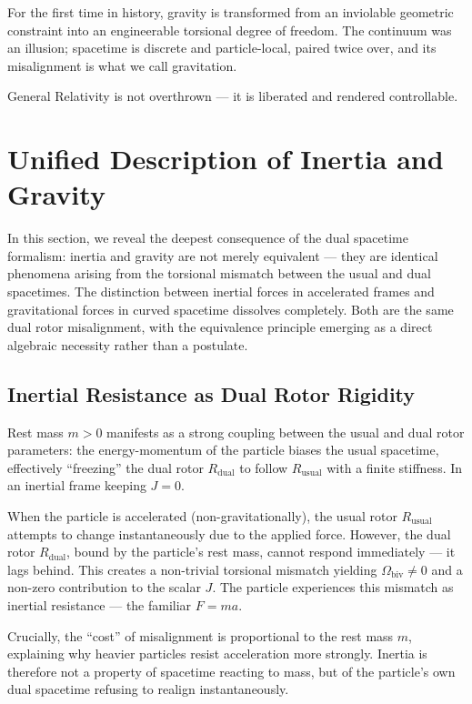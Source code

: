 \documentclass[dvipdfmx,a4paper]{article}
\begin{document}
For the first time in history, gravity is transformed from an inviolable geometric constraint into an engineerable torsional degree of freedom. The continuum was an illusion; spacetime is discrete and particle-local, paired twice over, and its misalignment is what we call gravitation.

General Relativity is not overthrown — it is liberated and rendered controllable.

\section{Unified Description of Inertia and Gravity}
\label{sec:unified}

In this section, we reveal the deepest consequence of the dual spacetime formalism: inertia and gravity are not merely equivalent — they are identical phenomena arising from the torsional mismatch between the usual and dual spacetimes. The distinction between inertial forces in accelerated frames and gravitational forces in curved spacetime dissolves completely. Both are the same dual rotor misalignment, with the equivalence principle emerging as a direct algebraic necessity rather than a postulate.

\subsection{Inertial Resistance as Dual Rotor Rigidity}

Rest mass $m > 0$ manifests as a strong coupling between the usual and dual rotor parameters: the energy-momentum of the particle biases the usual spacetime, effectively ``freezing'' the dual rotor $R_\text{dual}$ to follow $R_\text{usual}$ with a finite stiffness. In an inertial frame keeping $J = 0$.

When the particle is accelerated (non-gravitationally), the usual rotor $R_\text{usual}$ attempts to change instantaneously due to the applied force. However, the dual rotor $R_\text{dual}$, bound by the particle's rest mass, cannot respond immediately — it lags behind. This creates a non-trivial torsional mismatch yielding $\Omega_\text{biv} \neq 0$ and a non-zero contribution to the scalar $J$. The particle experiences this mismatch as inertial resistance — the familiar $F = ma$.

Crucially, the ``cost'' of misalignment is proportional to the rest mass $m$, explaining why heavier particles resist acceleration more strongly. Inertia is therefore not a property of spacetime reacting to mass, but of the particle's own dual spacetime refusing to realign instantaneously.
\end{document}
